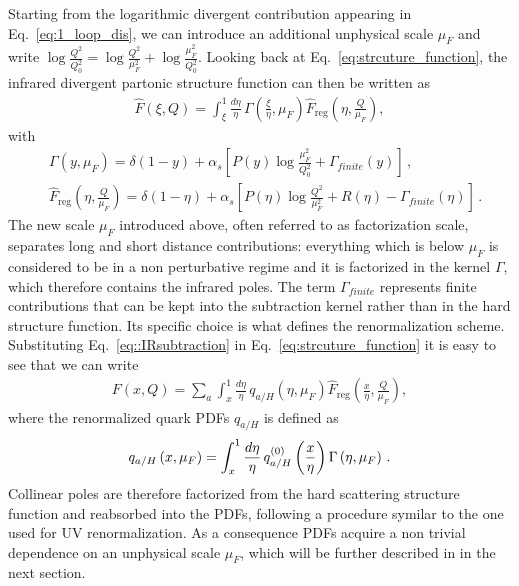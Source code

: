 %
Starting from the logarithmic divergent contribution appearing in Eq.~\eqref{eq:1_loop_dis}, we can introduce an
additional unphysical scale $\mu_F$ and write
$\log\frac{Q^2}{Q_0^2} = \log\frac{Q^2}{\mu_F^2} + \log\frac{\mu_F^2}{Q_0^2} $.
Looking back at Eq.~\eqref{eq:strcuture_function},
the infrared divergent partonic structure function can then be written as
\begin{align}
  \label{eq::IRsubtraction}
  \hat{F}\left(\xi,Q\right) = 
  \int_{\xi}^1 \frac{d\eta}{\eta} \,\Gamma\left(\frac{\xi}{\eta},\mu_F\right)
  \hat{F}_{\text{reg}}\left(\eta,\frac{Q}{\mu_F}\right) ,
\end{align}
with
\begin{align}
    &\Gamma\left(y,\mu_F\right) = \delta\left(1-y\right) 
    + \alpha_s\left[P\left(y\right)\log\frac{\mu_F^2}{Q_0^2} + \Gamma_{finite}\left(y\right)\right]\,, \\
    &\hat{F}_{\text{reg}}\left(\eta,\frac{Q}{\mu_F}\right) = \delta\left(1-\eta\right)  
    + \alpha_s
    \left[P\left(\eta\right)\log\frac{Q^2}{\mu_F^2}+ R\left(\eta\right) - \Gamma_{finite}\left(\eta\right) \right]\,.  
\end{align}
The new scale $\mu_F$ introduced above, often referred to as factorization scale, separates long and short distance 
contributions: everything which is below $\mu_F$ is considered to be in a non perturbative regime 
and it is factorized in the kernel $\Gamma$, which therefore contains the infrared poles.
The term $\Gamma_{finite}$ represents finite contributions that can be
kept into the subtraction kernel rather than in the hard structure function. Its specific choice is what defines
the renormalization scheme.  
Substituting Eq.~\eqref{eq::IRsubtraction} in Eq.~\eqref{eq:strcuture_function} it is easy to see that
we can write
\begin{align}
  F\left(x,Q\right) = \sum_a\int_x^1 \frac{d\eta}{\eta}\, 
  q_{a/H}\left(\eta,\mu_F\right)\hat{F}_{\text{reg}}\left(\frac{x}{\eta},\frac{Q}{\mu_F}\right),
\end{align}
where the renormalized quark PDFs $q_{a/H}$ is defined as
\begin{align}
    \label{eq:renormalized_pdf}
    q_{a/H}\left(x,\mu_F\right) = \int_x^1 \frac{d\eta}{\eta} \,
    q^{{(0)}}_{a/H}\left(\frac{x}{\eta}\right)\Gamma\left(\eta, \mu_F\right)\,.
\end{align}
Collinear poles are therefore factorized from the hard scattering structure function and reabsorbed into
the PDFs, following a procedure symilar to the one used for UV renormalization.
As a consequence PDFs acquire a non trivial dependence on an unphysical scale $\mu_F$,
which will be further described in in the next section.

